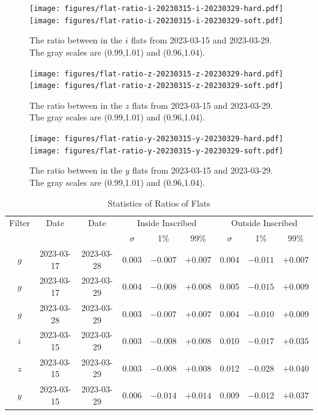 \documentclass{article}
\begin{document}
\begin{figure}[pb]
\begin{center}
\texttt{[image: figures/flat-ratio-i-20230315-i-20230329-hard.pdf]}
\texttt{[image: figures/flat-ratio-i-20230315-i-20230329-soft.pdf]}
\medskip
\caption{The ratio between in the $i$ flats from 2023-03-15 and 2023-03-29. The gray scales are (0.99,1.01) and (0.96,1.04).}
\label{figure:flat-ratio-i-20230315-i-20230329}
\end{center}
\end{figure}

\begin{figure}[pb]
\begin{center}
\texttt{[image: figures/flat-ratio-z-20230315-z-20230329-hard.pdf]}
\texttt{[image: figures/flat-ratio-z-20230315-z-20230329-soft.pdf]}
\medskip
\caption{The ratio between in the $z$ flats from 2023-03-15 and 2023-03-29. The gray scales are (0.99,1.01) and (0.96,1.04).}
\label{figure:flat-ratio-z-20230315-z-20230329}
\end{center}
\end{figure}

\begin{figure}[pb]
\begin{center}
\texttt{[image: figures/flat-ratio-y-20230315-y-20230329-hard.pdf]}
\texttt{[image: figures/flat-ratio-y-20230315-y-20230329-soft.pdf]}
\medskip
\caption{The ratio between in the $y$ flats from 2023-03-15 and 2023-03-29. The gray scales are (0.99,1.01) and (0.96,1.04).}
\label{figure:flat-ratio-y-20230315-y-20230329}
\label{figure:flat-ratio-last}
\end{center}
\end{figure}

\begin{table}[pb]
\begin{center}
\caption{Statistics of Ratios of Flats}
\label{table:flat-ratio}
\footnotesize
\begin{tabular}{ccccccccc}
\hline
Filter&Date&Date&\multicolumn{3}{c}{Inside Inscribed}&\multicolumn{3}{c}{Outside Inscribed}\\
&&&$\sigma$&1\%&99\%&$\sigma$&1\%&99\%\\
\hline
$g$ & 2023-03-17 & 2023-03-28 & 0.003 & $-0.007$ & $+0.007$ & 0.004 & $-0.011$ & $+0.007$ \\
$g$ & 2023-03-17 & 2023-03-29 & 0.004 & $-0.008$ & $+0.008$ & 0.005 & $-0.015$ & $+0.009$ \\
$g$ & 2023-03-28 & 2023-03-29 & 0.003 & $-0.007$ & $+0.007$ & 0.004 & $-0.010$ & $+0.009$ \\
$i$ & 2023-03-15 & 2023-03-29 & 0.003 & $-0.008$ & $+0.008$ & 0.010 & $-0.017$ & $+0.035$ \\
$z$ & 2023-03-15 & 2023-03-29 & 0.003 & $-0.008$ & $+0.008$ & 0.012 & $-0.028$ & $+0.040$ \\
$y$ & 2023-03-15 & 2023-03-29 & 0.006 & $-0.014$ & $+0.014$ & 0.009 & $-0.012$ & $+0.037$ \\
\hline
\end{tabular}
\end{center}
\end{table}
\end{document}
